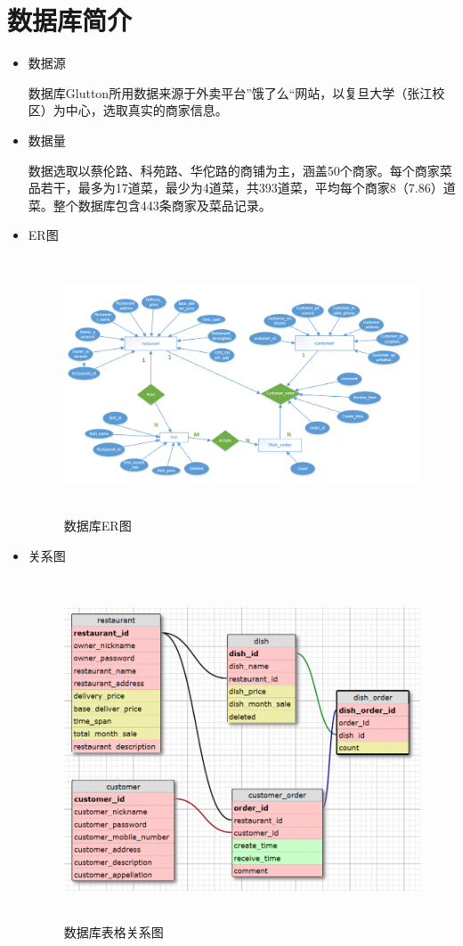 \documentclass[12pt, oneside,a4paper]{article}
\begin{document}
\section{数据库简介}
 \begin{itemize}
 \item 数据源
  \par\setlength{\parindent}{1em}\normalsize 数据库Glutton所用数据来源于外卖平台”饿了么“网站，以复旦大学（张江校区）为中心，选取真实的商家信息。
 \item 数据量
  \par\setlength{\parindent}{1em}\normalsize 数据选取以蔡伦路、科苑路、华佗路的商铺为主，涵盖50个商家。每个商家菜品若干，最多为17道菜，最少为4道菜，共393道菜，平均每个商家8（7.86）道菜。整个数据库包含443条商家及菜品记录。
 \item ER图
  \begin{figure}[H]
   \centering
     \includegraphics[width=5.00in,height=3.00in]{ER.png}
     \caption{\small{数据库ER图}}\label{fig:dummy}
  \end{figure}

 \item 关系图
  \begin{figure}[H]
    \centering
     \includegraphics[width=6.00in,height=4.00in]{tables.png}
     \caption{\small{数据库表格关系图}}\label{fig:dummy}
  \end{figure}


\end{itemize}
\end{document}
